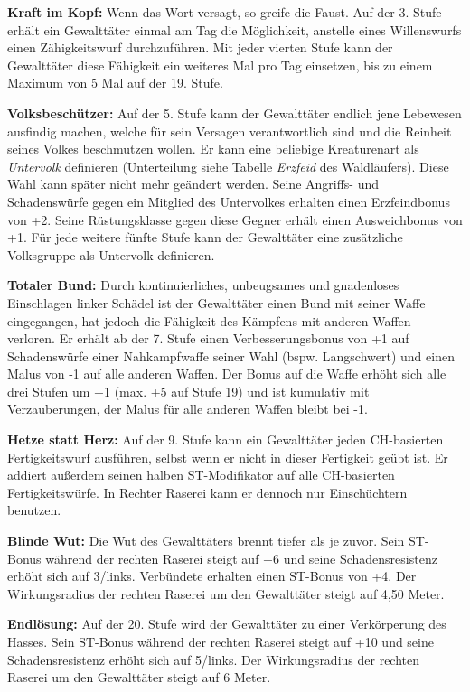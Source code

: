 \documentclass[
	ngerman,
	a4paper,
	11pt,
	twocolumn,
]{scrartcl}
\begin{document}
\textbf{Kraft im Kopf:} Wenn das Wort versagt, so greife die Faust. Auf der 3. Stufe erhält ein Gewalttäter einmal am Tag die Möglichkeit, anstelle eines Willenswurfs einen Zähigkeitswurf durchzuführen. Mit jeder vierten Stufe kann der Gewalttäter diese Fähigkeit ein weiteres Mal pro Tag einsetzen, bis zu einem Maximum von 5 Mal auf der 19. Stufe.

\textbf{Volksbeschützer:} Auf der 5. Stufe kann der Gewalttäter endlich jene Lebewesen ausfindig machen, welche für sein Versagen verantwortlich sind und die Reinheit seines Volkes beschmutzen wollen. Er kann eine beliebige Kreaturenart als \textit{Untervolk} definieren (Unterteilung siehe Tabelle \textit{Erzfeid} des Waldläufers). Diese Wahl kann später nicht mehr geändert werden. Seine Angriffs- und Schadenswürfe gegen ein Mitglied des Untervolkes erhalten einen Erzfeindbonus von +2. Seine Rüstungsklasse gegen diese Gegner erhält einen Ausweichbonus von +1. Für jede weitere fünfte Stufe kann der Gewalttäter eine zusätzliche Volksgruppe als Untervolk definieren.

\textbf{Totaler Bund:} Durch kontinuierliches, unbeugsames und gnadenloses Einschlagen linker Schädel ist der Gewalttäter einen Bund mit seiner Waffe eingegangen, hat jedoch die Fähigkeit des Kämpfens mit anderen Waffen verloren. Er erhält ab der 7. Stufe einen Verbesserungsbonus von +1 auf Schadenswürfe einer Nahkampfwaffe seiner Wahl (bspw. Langschwert) und einen Malus von -1 auf alle anderen Waffen. Der Bonus auf die Waffe erhöht sich alle drei Stufen um +1 (max. +5 auf Stufe 19) und ist kumulativ mit Verzauberungen, der Malus für alle anderen Waffen bleibt bei -1.

\textbf{Hetze statt Herz:} Auf der 9. Stufe kann ein Gewalttäter jeden CH-basierten Fertigkeitswurf ausführen, selbst wenn er nicht in dieser Fertigkeit geübt ist. Er addiert außerdem seinen halben ST-Modifikator auf alle CH-basierten Fertigkeitswürfe. In Rechter Raserei kann er dennoch nur Einschüchtern benutzen.

\textbf{Blinde Wut:} Die Wut des Gewalttäters brennt tiefer als je zuvor. Sein ST-Bonus während der rechten Raserei steigt auf +6 und seine Schadensresistenz erhöht sich auf 3/links. Verbündete erhalten einen ST-Bonus von +4. Der Wirkungsradius der rechten Raserei um den Gewalttäter steigt auf 4,50 Meter.

\textbf{Endlösung:} Auf der 20. Stufe wird der Gewalttäter zu einer Verkörperung des Hasses. Sein ST-Bonus während der rechten Raserei steigt auf +10 und seine Schadensresistenz erhöht sich auf 5/links. Der Wirkungsradius der rechten Raserei um den Gewalttäter steigt auf 6 Meter.
\end{document}
